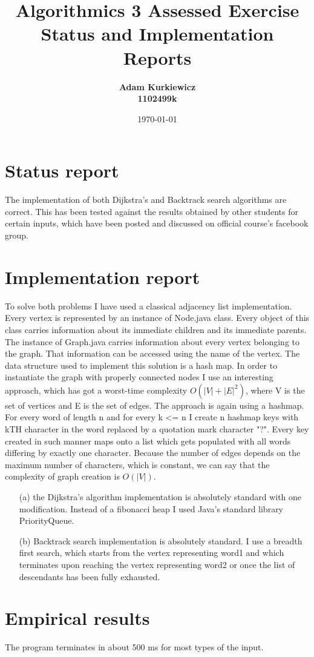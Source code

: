 \documentclass{article}
\title{Algorithmics 3 Assessed Exercise\\ \vspace{4mm} 
Status and Implementation Reports}
\author{\bf Adam Kurkiewicz\\ \bf 1102499k}
\date{\today}
\begin{document}
\maketitle

\section*{Status report}

The implementation of both Dijkstra's and Backtrack search algorithms are correct. This has been tested against the results obtained by other students for certain inputs, which have been posted and discussed on official course's facebook group.

\section*{Implementation report}

To solve both problems I have used a classical adjacency list implementation. Every vertex is represented by an instance of Node.java class. Every object of this class carries information about its immediate children and its immediate parents. The instance of Graph.java carries information about every vertex belonging to the graph. That information can be accessed using the name of the vertex. The data structure used to implement this solution is a hash map. In order to instantiate the graph with properly connected nodes I use an interesting approach, which has got a worst-time complexity $O(\left\vert{V}\right\vert + \left\vert{E}\right\vert^2)$, where V is the set of vertices and E is the set of edges. The approach is again using a hashmap. For every word of length n and for every k <= n I create n hashmap keys with k\uppercase{th} character in the word replaced by a quotation mark character "?". Every key created in such manner maps onto a list which gets populated with all words differing by exactly one character. Because the number of edges depends on the maximum number of characters, which is constant, we can say that the complexity of graph creation is $O(\left\vert{V}\right\vert)$. 

\begin{itemize}
\item[(a)] 
the Dijkstra's algorithm implementation is absolutely standard with one modification. Instead of a fibonacci heap I used Java's standard library PriorityQueue.
\item[(b)]
Backtrack search implementation is absolutely standard. I use a breadth first search, which starts from the vertex representing word1 and which terminates upon reaching the vertex representing word2 or once the list of descendants has been fully exhausted.
\end{itemize}

\section*{Empirical results}

The program terminates in about 500 ms for most types of the input. 
\end{document}
